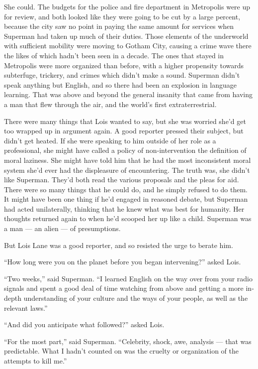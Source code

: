 She could. The budgets for the police and fire department in Metropolis
were up for review, and both looked like they were going to be cut by a
large percent, because the city saw no point in paying the same amount
for services when Superman had taken up much of their duties. Those
elements of the underworld with sufficient mobility were moving to
Gotham City, causing a crime wave there the likes of which hadn't been
seen in a decade. The ones that stayed in Metropolis were more organized
than before, with a higher propensity towards subterfuge, trickery, and
crimes which didn't make a sound. Superman didn't speak anything but
English, and so there had been an explosion in language learning. That
was above and beyond the general insanity that came from having a man
that flew through the air, and the world's first extraterrestrial.

There were many things that Lois wanted to say, but she was worried
she'd get too wrapped up in argument again. A good reporter pressed
their subject, but didn't get heated. If she were speaking to him
outside of her role as a professional, she might have called a policy of
non‐intervention the definition of moral laziness. She might have told
him that he had the most inconsistent moral system she'd ever had the
displeasure of encountering. The truth was, she didn't like Superman.
They'd both read the various proposals and the pleas for aid. There were
so many things that he could do, and he simply refused to do them. It
might have been one thing if he'd engaged in reasoned debate, but
Superman had acted unilaterally, thinking that he knew what was best for
humanity. Her thoughts returned again to when he'd scooped her up like a
child. Superman was a man --- an alien --- of presumptions.

But Lois Lane was a good reporter, and so resisted the urge to berate
him.

``How long were you on the planet before you began intervening?'' asked
Lois.

``Two weeks,'' said Superman. ``I learned English on the way over from
your radio signals and spent a good deal of time watching from above and
getting a more in‐depth understanding of your culture and the ways of
your people, as well as the relevant laws.''

``And did you anticipate what followed?'' asked Lois.

``For the most part,'' said Superman. ``Celebrity, shock, awe, analysis
--- that was predictable. What I hadn't counted on was the cruelty or
organization of the attempts to kill me.''

